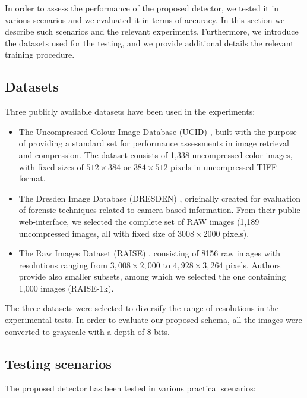 \documentclass{ieeeaccess}
\begin{document}
In order to assess the performance of the proposed detector, we tested it in various scenarios and we evaluated it in terms of accuracy. In this section we describe such scenarios and the relevant experiments. Furthermore, we introduce the datasets used for the testing, and we provide additional details the relevant training procedure.

\subsection{Datasets}
\label{subsec:datasets}

Three publicly available datasets have been used in the experiments:
\begin{itemize}
	\item The Uncompressed Colour Image Database (UCID) \cite{schaefer2003ucid}, built with the purpose of providing a standard set for performance assessments in image retrieval and compression. The dataset consists of 1,338 uncompressed color images, with fixed sizes of $512\times384$ or $384\times512$ pixels in uncompressed TIFF format.
	\item The Dresden Image Database (DRESDEN) \cite{gloe2010dresden}, originally created for evaluation of forensic techniques related to camera-based information. From their public web-interface, we selected the complete set of RAW images (1,189 uncompressed images, all with fixed size of $3008\times2000$ pixels).
	\item The Raw Images Dataset (RAISE) \cite{dang2015raise}, consisting of 8156 raw images with resolutions ranging from $3,008\times2,000$ to $4,928\times3,264$ pixels. Authors provide also smaller subsets, among which we selected the one containing 1,000 images (RAISE-1k).
\end{itemize}

The three datasets were selected to diversify the range of resolutions in the experimental tests. In order to evaluate our proposed schema, all the images were converted to grayscale with a depth of 8 bits.

\subsection{Testing scenarios}
\label{subsec:test_scenarios}
The proposed detector has been tested in various practical scenarios:%
\end{document}
